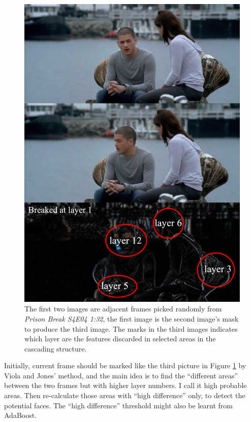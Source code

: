 \documentclass[10pt,twocolumn,letterpaper]{article}
\begin{document}
\begin{figure}[t]
    \begin{center}
        \includegraphics[width=0.9\linewidth]{extension}
    \end{center}
    \caption{The first two images are adjacent frames picked randomly from \textit{Prison Break S4E04 1:32},
    the first image is the second image's mask to produce the third image.
    The marks in the third images indicates which layer are the features discarded in selected areas in the cascading structure.}
    \label{fig:ext}
\end{figure}

Initially, current frame should be marked like the third picture in Figure \ref{fig:ext} by Viola and Jones' method,
and the main idea is to find the ``different areas'' between the two frames but with higher layer numbers.
I call it high probable areas.
Then re-calculate those areas with ``high difference'' only, to detect the potential faces.
The ``high difference'' threshold might also be learnt from AdaBoost.
\end{document}

